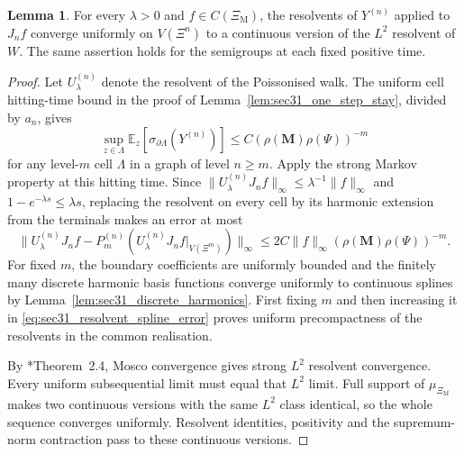 \documentclass{article}
\theoremstyle{plain}
\theoremstyle{definition}
\newtheorem{lemma}[theorem]{Lemma}
\begin{document}
\begingroup\color{red}
\begin{lemma}\label{lem:sec31_uniform_resolvent}
For every $\lambda>0$ and $f\in C(\Xi_{\mathrm M})$, the resolvents of
$Y^{(n)}$ applied to $J_n f$ converge uniformly on $V(\Xi^n)$ to a
continuous version of the $L^2$ resolvent of $W$.
The same assertion holds for the semigroups at each fixed positive time.
\end{lemma}
\begin{proof}
Let $U_\lambda^{(n)}$ denote the resolvent of the Poissonised walk.
The uniform cell hitting-time bound in the proof of
Lemma~\ref{lem:sec31_one_step_stay}, divided by $a_n$, gives
\[
\sup_{z\in\Lambda}\mathbb E_z[\sigma_{\partial\Lambda}(Y^{(n)})]
\le C(\rho(\mathbf M)\rho(\Psi))^{-m}
\]
for any level-$m$ cell $\Lambda$ in a graph of level $n\ge m$.
Apply the strong Markov property at this hitting time. Since
$\|U_\lambda^{(n)}J_n f\|_\infty\le\lambda^{-1}\|f\|_\infty$ and
$1-e^{-\lambda s}\le\lambda s$, replacing the resolvent on every
cell by its harmonic extension from the terminals makes an error at most
\begin{equation}\label{eq:sec31_resolvent_spline_error}
\|U_\lambda^{(n)}J_n f
  -P_m^{(n)}(U_\lambda^{(n)}J_n f|_{V(\Xi^m)})\|_\infty
\le 2C\|f\|_\infty(\rho(\mathbf M)\rho(\Psi))^{-m}.
\end{equation}
For fixed $m$, the boundary coefficients are uniformly bounded and the
finitely many discrete harmonic basis functions converge uniformly to
continuous splines by Lemma~\ref{lem:sec31_discrete_harmonics}.
First fixing $m$ and then increasing it in
\eqref{eq:sec31_resolvent_spline_error} proves uniform precompactness of
the resolvents in the common realisation.

By \cite{kuwae2003convergence}*{Theorem~2.4}, Mosco convergence gives
strong $L^2$ resolvent convergence. Every uniform subsequential limit must
equal that $L^2$ limit. Full support of $\mu_{\Xi_{\mathrm M}}$ makes
two continuous versions with the same $L^2$ class identical, so the whole
sequence converges uniformly. Resolvent identities, positivity and the
supremum-norm contraction pass to these continuous versions.


\end{proof}
\end{document}
